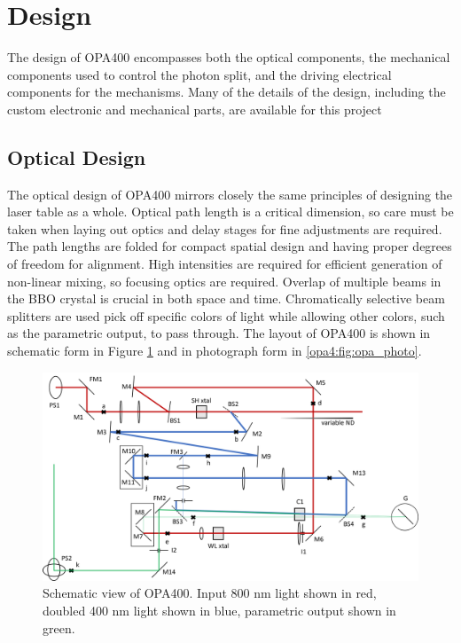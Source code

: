 \clearpage

\section{Design}  %

The design of OPA400 encompasses both the optical components, the mechanical components used to control the photon split, and the driving electrical components for the mechanisms.
Many of the details of the design, including the custom electronic and mechanical parts, are available for this project 

\subsection{Optical Design}

The optical design of OPA400 mirrors closely the same principles of designing the laser table as a whole.
Optical path length is a critical dimension, so care must be taken when laying out optics and delay stages for fine adjustments are required.
The path lengths are folded for compact spatial design and having proper degrees of freedom for alignment.
High intensities are required for efficient generation of non-linear mixing, so focusing optics are required.
Overlap of multiple beams in the BBO crystal is crucial in both space and time.
Chromatically selective beam splitters are used pick off specific colors of light while allowing other colors, such as the parametric output, to pass through.
The layout of OPA400 is shown in schematic form in Figure \ref{opa4:fig:opa_schematic} and in photograph form in \ref{opa4:fig:opa_photo}.

\begin{figure}
	\includegraphics[width=6in]{opa400/images/opa400_schematic}
\caption[OPA 400 Optics]{
	Schematic view of OPA400.
	Input 800 nm light shown in red, doubled 400 nm light shown in blue, parametric output shown in green.
}
\label{opa4:fig:opa_schematic}
\end{figure}

